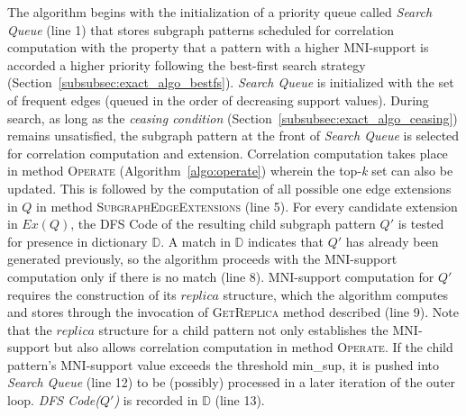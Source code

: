 The algorithm begins with the initialization of a priority queue called
\textit{Search Queue} (line 1) that stores subgraph patterns scheduled for
correlation computation with the property that a pattern with a higher
MNI-support is accorded a higher priority following the best-first search
strategy (Section~\ref{subsubsec:exact_algo_bestfs}). \textit{Search Queue} is
initialized with the set of frequent edges (queued in the order of decreasing
support values). During search, as long as the \textit{ceasing condition}
(Section~\ref{subsubsec:exact_algo_ceasing}) remains unsatisfied, the subgraph pattern at
the front of \textit{Search Queue} is selected for correlation computation and
extension. Correlation computation takes place in method \textsc{Operate}
(Algorithm~\ref{algo:operate}) wherein the top-\textit{k} set can also be
updated. This is followed by the computation of all possible one edge extensions
in $Q$ in method \textsc{SubgraphEdgeExtensions} (line 5). For every candidate
extension in $Ex(Q)$, the DFS Code of the resulting child subgraph pattern $Q'$
is tested for presence in dictionary $\mathbb{D}$. A match in $\mathbb{D}$
indicates that $Q'$ has already been generated previously, so the algorithm
proceeds with the MNI-support computation only if there is no match (line 8).
MNI-support computation for $Q'$ requires the construction of its $replica$
structure, which the algorithm computes and stores through the invocation of
\textsc{GetReplica} method described (line 9). Note that the $replica$ structure
for a child pattern not only establishes the MNI-support but also allows
correlation computation in method \textsc{Operate}. If the child pattern's
MNI-support value exceeds the threshold {\sf min\_sup}, it is pushed into
\textit{Search Queue} (line 12) to be (possibly) processed in a later iteration of
the outer loop. \textit{DFS Code($Q'$)} is recorded in $\mathbb{D}$ (line 13).

